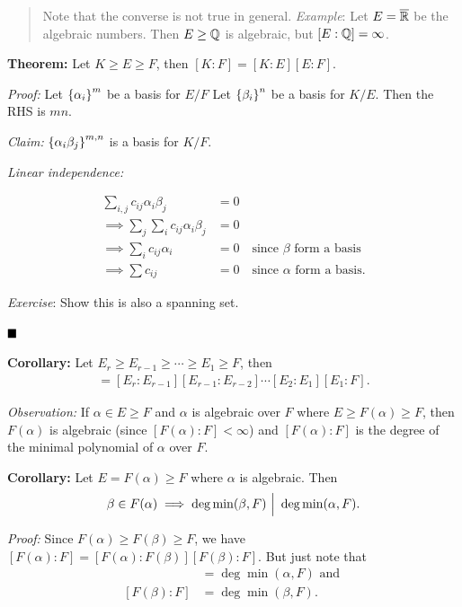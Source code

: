 \begin{quote}
Note that the converse is not true in general. \emph{Example}: Let
\(E = \overline {{\mathbb{R}}}\) be the algebraic numbers. Then \(E \geq {\mathbb{Q}}\) is
algebraic, but \([E : {\mathbb{Q}}] = \infty\).
\end{quote}

\textbf{Theorem:} Let \(K \geq E \geq F\), then
\([K: F] = [K: E] [E: F]\).

\emph{Proof:} Let \(\left\{{\alpha_i}\right\}^m\) be a basis for \(E/F\) Let
\(\left\{{\beta_i}\right\}^n\) be a basis for \(K / E\). Then the RHS is \(mn\).

\emph{Claim:} \(\left\{{\alpha_i \beta_j}\right\}^{m, n}\) is a basis for
\(K/ F\).

\emph{Linear independence:}

\begin{align*}
\sum_{i, j} c_{ij} \alpha _i \beta_j &= 0 \\
\implies \sum_j \sum_i c_{ij} \alpha_i \beta_j &= 0 \\
\implies \sum_i c_{ij} \alpha_i &= 0 \quad \text{since $\beta$ form a basis} \\
\implies \sum c_{ij} &= 0 \quad \text{since $\alpha$ form a basis}
.\end{align*}

\emph{Exercise}: Show this is also a spanning set.

\(\qed\)

\textbf{Corollary:} Let
\(E_r \geq E_{r-1} \geq \cdots \geq E_1 \geq F\), then
\begin{align*}
[E_r: F]= [E_r: E_{r-1}][E_{r-1}:E_{r-2}] \cdots [E_2: E_1][E_1 : F]
.\end{align*}

\emph{Observation:} If \(\alpha \in E \geq F\) and \(\alpha\) is
algebraic over \(F\) where \(E \geq F(\alpha) \geq F\), then
\(F(\alpha)\) is algebraic (since \([F(\alpha): F] < \infty\)) and
\([F(\alpha): F]\) is the degree of the minimal polynomial of \(\alpha\)
over \(F\).

\textbf{Corollary:} Let \(E = F(\alpha) \geq F\) where \(\alpha\) is
algebraic. Then
\begin{align*}\beta \in F(\alpha) \implies \deg \min(\beta, F) {~\Bigm| ~} \deg \min(\alpha, F)
.\end{align*}

\emph{Proof:} Since \(F(\alpha) \geq F(\beta) \geq F\), we have
\([F(\alpha): F] = [F(\alpha): F(\beta)][F(\beta): F]\). But just note
that \begin{align*}
[F(\alpha): F]  &= \deg \min (\alpha, F) \text{ and } \\
[F(\beta): F]   &= \deg \min (\beta, F)
.\end{align*}

